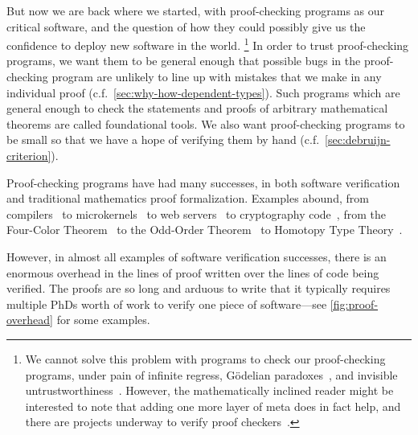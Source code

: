 But now we are back where we started, with proof-checking programs as our critical software, and the question of how they could possibly give us the confidence to deploy new software in the world.%
\footnote{%
  We cannot solve this problem with programs to check our proof-checking programs, under pain of infinite regress, Gödelian paradoxes~\cite{sep-goedel-incompleteness}, and invisible untrustworthiness~\cite{Reflections1984Thompson}.
  However, the mathematically inclined reader might be interested to note that adding one more layer of meta does in fact help, and there are projects underway to verify proof checkers~\cite{nuprl-in-coq,coq-coq-correct,certicoq}.
}
In order to trust proof-checking programs, we want them to be general enough that possible bugs in the proof-checking program are unlikely to line up with mistakes that we make in any individual proof (c.f.~\autoref{sec:why-how-dependent-types}).
Such programs which are general enough to check the statements and proofs of arbitrary mathematical theorems are called foundational tools.
We also want proof-checking programs to be small so that we have a hope of verifying them by hand (c.f.~\autoref{sec:debruijn-criterion}).

Proof-checking programs have had many successes, in both software verification and traditional mathematics proof formalization.
Examples abound, from compilers~\cite{Compcert} to microkernels~\cite{seL4SOSP09} to web servers~\cite{Network2015Chlipala} to cryptography code~\cite{FiatCryptoSP19}, from the Four-Color Theorem~\cite{gonthier2008formal} to the Odd-Order Theorem~\cite{gonthier2013machine} to Homotopy Type Theory~\cite{HoTTBook}.

However, in almost all examples of software verification successes, there is an enormous overhead in the lines of proof written over the lines of code being verified.
The proofs are so long and arduous to write that it typically requires multiple PhDs worth of work to verify one piece of software---see \autoref{fig:proof-overhead} for some examples.
\label{sec:manual-proof-long}

